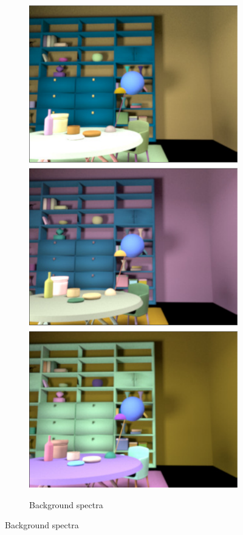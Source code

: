 \documentclass{jov}
\begin{document}
\begin{figure}
\begin{subfigure}[b]{0.18 \textwidth}
        \label{fig:illuminationVariation}
    \end{subfigure}
          ~  
    \begin{subfigure}[b]{0.18 \textwidth}
    \centering
        \caption{Background spectra}
        \includegraphics[width=\textwidth]{../FiguresDraft5/Figure4/Figure4_e.pdf}
        \label{fig:backGroundVariation}
    \end{subfigure}


\end{figure}
\end{document}
